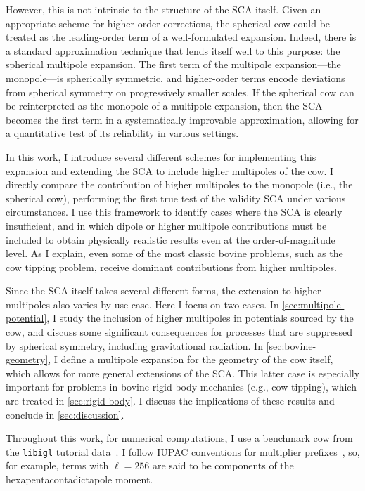\documentclass[
    prd, twocolumn, nofootinbib, amsmath, amssymb,
    aps, floatfix, preprintnumbers
]{revtex4-2}
\begin{document}
However, this is not intrinsic to the structure of the SCA itself. Given an appropriate scheme for higher-order corrections, the spherical cow could be treated as the leading-order term of a well-formulated expansion. Indeed, there is a standard approximation technique that lends itself well to this purpose: the spherical multipole expansion. The first term of the multipole expansion---the monopole---is spherically symmetric, and higher-order terms encode deviations from spherical symmetry on progressively smaller scales. If the spherical cow can be reinterpreted as the monopole of a multipole expansion, then the SCA becomes the first term in a systematically improvable approximation, allowing for a quantitative test of its reliability in various settings.

In this work, I introduce several different schemes for implementing this expansion and extending the SCA to include higher multipoles of the cow. I directly compare the contribution of higher multipoles to the monopole (i.e., the spherical cow), performing the first true test of the validity SCA under various circumstances. I use this framework to identify cases where the SCA is clearly insufficient, and in which dipole or higher multipole contributions must be included to obtain physically realistic results even at the order-of-magnitude level. As I explain, even some of the most classic bovine problems, such as the cow tipping problem, receive dominant contributions from higher multipoles.

Since the SCA itself takes several different forms, the extension to higher multipoles also varies by use case. Here I focus on two cases. In \cref{sec:multipole-potential}, I study the inclusion of higher multipoles in potentials sourced by the cow, and discuss some significant consequences for processes that are suppressed by spherical symmetry, including gravitational radiation. In \cref{sec:bovine-geometry}, I define a multipole expansion for the geometry of the cow itself, which allows for more general extensions of the SCA\@. This latter case is especially important for problems in bovine rigid body mechanics (e.g., cow tipping), which are treated in \cref{sec:rigid-body}. I discuss the implications of these results and conclude in \cref{sec:discussion}.

Throughout this work, for numerical computations, I use a benchmark cow from the \texttt{libigl} tutorial data~\cite{libigl,libigl-cow}. I follow IUPAC conventions for multiplier prefixes~\cite{IUPAC:2014}, so, for example, terms with $\ell = 256$ are said to be components of the hexapentacontadictapole moment.
\end{document}
